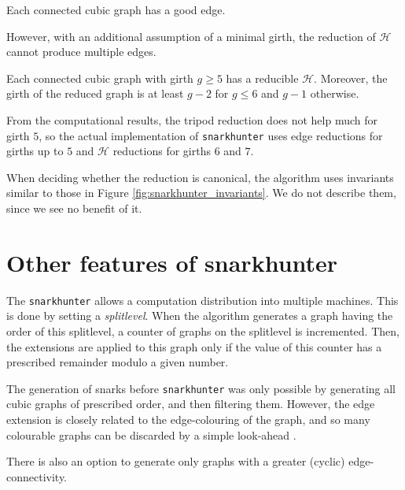 \begin{lemma}\emph{\cite[p. 264]{snarkhunter_better}}
    Each connected cubic graph has a good edge.
\end{lemma}

However, with an additional assumption of a minimal girth, the reduction of $\mathcal H$ cannot produce multiple edges.

\begin{theorem}\emph{\cite[p. 264]{snarkhunter_better}}
    Each connected cubic graph with girth $g\geq 5$ has a reducible $\mathcal H$. Moreover, the girth of the reduced graph is at least $g-2$ for $g\leq 6$ and $g-1$ otherwise. \label{th:reducible_H}
\end{theorem}

From the computational results, the tripod reduction does not help much for girth $5$, so the actual implementation of \texttt{snarkhunter} uses edge reductions for girths up to $5$ and $\mathcal H$ reductions for girths $6$ and $7$.

When deciding whether the reduction is canonical, the algorithm uses invariants similar to those in Figure \ref{fig:snarkhunter_invariants}. We do not describe them, since we see no benefit of it.

\section{Other features of snarkhunter}

The \texttt{snarkhunter} allows a computation distribution into multiple machines. This is done by setting a \emph{splitlevel}. When the algorithm generates a graph having the order of this splitlevel, a counter of graphs on the splitlevel is incremented. Then, the extensions are applied to this graph only if the value of this counter has a prescribed remainder modulo a given number.

The generation of snarks before \texttt{snarkhunter} was only possible by generating all cubic graphs of prescribed order, and then filtering them. However, the edge extension is closely related to the edge-colouring of the graph, and so many colourable graphs can be discarded by a simple look-ahead \cite{snarkhunter_snarks}.

There is also an option to generate only graphs with a greater (cyclic) edge-connectivity.
